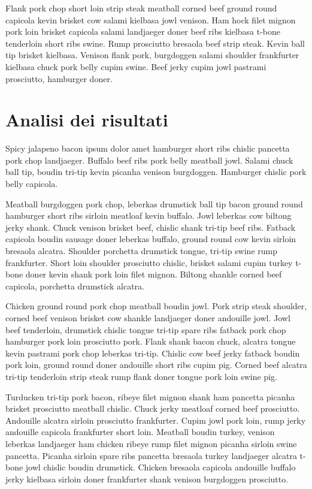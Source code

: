 \documentclass[a4paper]{article}
\begin{document}
Flank pork chop short loin strip steak meatball corned beef ground round capicola kevin brisket cow salami kielbasa jowl venison. Ham hock filet mignon pork loin brisket capicola salami landjaeger doner beef ribs kielbasa t-bone tenderloin short ribs swine. Rump prosciutto bresaola beef strip steak. Kevin ball tip brisket kielbasa. Venison flank pork, burgdoggen salami shoulder frankfurter kielbasa chuck pork belly cupim swine. Beef jerky cupim jowl pastrami prosciutto, hamburger doner.

\section{Analisi dei risultati}

Spicy jalapeno bacon ipsum dolor amet hamburger short ribs chislic pancetta pork chop landjaeger. Buffalo beef ribs pork belly meatball jowl. Salami chuck ball tip, boudin tri-tip kevin picanha venison burgdoggen. Hamburger chislic pork belly capicola.

Meatball burgdoggen pork chop, leberkas drumstick ball tip bacon ground round hamburger short ribs sirloin meatloaf kevin buffalo. Jowl leberkas cow biltong jerky shank. Chuck venison brisket beef, chislic shank tri-tip beef ribs. Fatback capicola boudin sausage doner leberkas buffalo, ground round cow kevin sirloin bresaola alcatra. Shoulder porchetta drumstick tongue, tri-tip swine rump frankfurter. Short loin shoulder prosciutto chislic, brisket salami cupim turkey t-bone doner kevin shank pork loin filet mignon. Biltong shankle corned beef capicola, porchetta drumstick alcatra.

Chicken ground round pork chop meatball boudin jowl. Pork strip steak shoulder, corned beef venison brisket cow shankle landjaeger doner andouille jowl. Jowl beef tenderloin, drumstick chislic tongue tri-tip spare ribs fatback pork chop hamburger pork loin prosciutto pork. Flank shank bacon chuck, alcatra tongue kevin pastrami pork chop leberkas tri-tip. Chislic cow beef jerky fatback boudin pork loin, ground round doner andouille short ribs cupim pig. Corned beef alcatra tri-tip tenderloin strip steak rump flank doner tongue pork loin swine pig.

Turducken tri-tip pork bacon, ribeye filet mignon shank ham pancetta picanha brisket prosciutto meatball chislic. Chuck jerky meatloaf corned beef prosciutto. Andouille alcatra sirloin prosciutto frankfurter. Cupim jowl pork loin, rump jerky andouille capicola frankfurter short loin. Meatball boudin turkey, venison leberkas landjaeger ham chicken ribeye rump filet mignon picanha sirloin swine pancetta. Picanha sirloin spare ribs pancetta bresaola turkey landjaeger alcatra t-bone jowl chislic boudin drumstick. Chicken bresaola capicola andouille buffalo jerky kielbasa sirloin doner frankfurter shank venison burgdoggen prosciutto.
\end{document}
